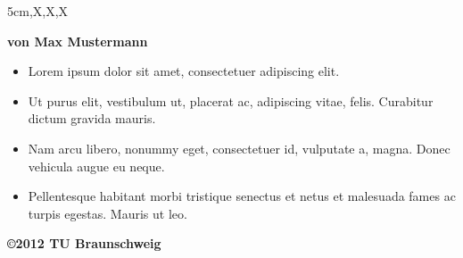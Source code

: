 \documentclass[a2paper,style=scifi,table,parskip=full]{tubsposter}
\begin{document}
  \begin{tubsposter}[sender=bottom]{5cm,X,X,X}
  \showtubslogo[right]
  \begin{posterrow}[bgcolor=tubsLightGray]
    \vfill
    \bfseries\large von Max Mustermann
  \end{posterrow}
  \begin{posterrow}[X,X]
    \begin{postercol}
      \lipsum[2]
    \end{postercol}
    \begin{postercol}
      \itshape\centering\lipsum[3]
    \end{postercol}
  \end{posterrow}
  \begin{posterrow}[28cm,X]
    \begin{postercol}
      \begin{itemize}
        \item Lorem ipsum dolor sit amet, consectetuer adipiscing elit.
        \item Ut purus elit, vestibulum ut, placerat ac, adipiscing vitae, felis.
          Curabitur dictum gravida mauris.
        \item Nam arcu libero, nonummy eget, consectetuer id, vulputate a, magna.
          Donec vehicula augue eu neque.
        \item Pellentesque habitant morbi tristique
          senectus et netus et malesuada fames ac turpis egestas. Mauris ut leo. 
      \end{itemize}
    \end{postercol}
    \begin{postercol}[bgimage=infozentrum]
    \end{postercol}
  \end{posterrow}
  \begin{modrow}[fgcolor=tubsBlueDark]
    \lipsum[4]\par\lipsum[5]
    \vfill
    \bfseries\raggedleft\copyright 2012 TU Braunschweig
  \end{modrow}
  \end{tubsposter}
\end{document}

